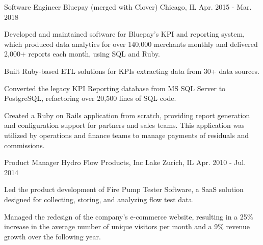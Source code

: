 \begin{cventries}

    \cventry
    {Software Engineer} %
    {Bluepay (merged with Clover)} %
    {Chicago, IL} %
    {Apr. 2015 - Mar. 2018} %
    {
        \begin{cvitems} %
            \item {Developed and maintained software for Bluepay's KPI and reporting system, which produced data analytics for over 140,000 merchants monthly and delivered 2,000+ reports each month, using SQL and Ruby.}
            \item {Built Ruby-based ETL solutions for KPIs extracting data from 30+ data sources.}
            \item {Converted the legacy KPI Reporting database from MS SQL Server to PostgreSQL, refactoring over 20,500 lines of SQL code.}
            \item {Created a Ruby on Rails application from scratch, providing report generation and configuration support for partners and sales teams. This application was utilized by operations and finance teams to manage payments of residuals and commissions.}
        \end{cvitems}
    }


    \cventry
    {Product Manager} %
    {Hydro Flow Products, Inc} %
    {Lake Zurich, IL} %
    {Apr. 2010 - Jul. 2014} %
    {
        \begin{cvitems} %
            \item {Led the product development of Fire Pump Tester Software, a SaaS solution designed for collecting, storing, and analyzing flow test data.}
            \item {Managed the redesign of the company's e-commerce website, resulting in a 25\% increase in the average number of unique visitors per month and a 9\% revenue growth over the following year.}
        \end{cvitems}
    }

\end{cventries}

